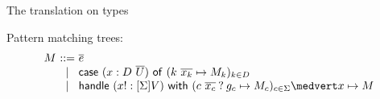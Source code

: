 \documentclass[preprint]{sigplanconf}
\makeatletter
\newcommand{\lameff}{$\lambda_\mathrm{eff}$\xspace}
\newcommand{\many}{\overline}
\newcommand\ba{\begin{array}}
\newcommand\ea{\end{array}}
\newenvironment{equations}{\[\ba{@{}r@{~}c@{~}l@{}}}{\ea\]}
\newenvironment{syntax}{\[\ba{@{}l@{~}r@{~}c@{~}l@{}}}{\ea\]}
\newcommand{\rt}[1]{\langle{#1}\rangle}   %
\newcommand{\sig}{S}
\newcommand{\sigs}{\Sigma}
\newcommand{\effbox}[1]{[#1]}
\newcommand{\key}[1]{\mathsf{#1}}
\newcommand{\handleSymbol}{\mathbin{?}}
\newcommand{\handle}[2]{{#1} \handleSymbol {#2}}
\newcommand{\thunk}[1]{\{{#1}\}}
\newcommand{\force}[1]{{#1}!}
\newcommand\slab[1]{(\textrm{#1})}
\makeatother
\begin{document}
The translation on types





  

Pattern matching trees:
\begin{equations}
M &::= & \many{e} \\
  &\mid& \key{case}~(x:D~\many{U})~\key{of}~(k~\many{x_k} \mapsto M_k)_{k \in D} \\
  &\mid& \key{handle}~(\force{x}:\effbox{\sigs}V)~\key{with}~
          (\handle{c~\many{x_c}}{g_c} \mapsto M_c)_{c \in \sigs} \medvert
          x        \mapsto M
\end{equations}





\end{document}
